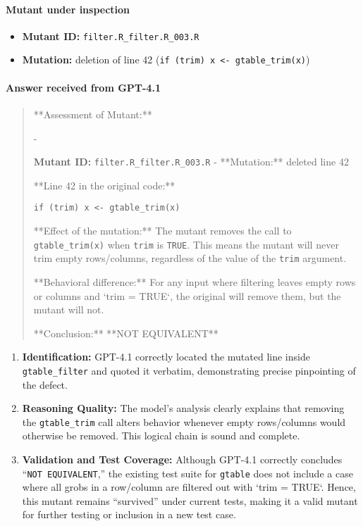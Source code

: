 \paragraph{Mutant under inspection}
\begin{itemize}
  \item \textbf{Mutant ID:} \texttt{filter.R\_filter.R\_003.R}
  \item \textbf{Mutation:} deletion of line 42 (\texttt{if (trim) x <- gtable\_trim(x)})
\end{itemize}

\paragraph{Answer received from GPT-4.1}
\begin{quote}
**Assessment of Mutant:**

-   \item \textbf{Mutant ID:} \texttt{filter.R\_filter.R\_003.R}  
- **Mutation:** deleted line 42

**Line 42 in the original code:**
\begin{verbatim}
if (trim) x <- gtable_trim(x)
\end{verbatim}

**Effect of the mutation:**  
The mutant removes the call to \texttt{gtable\_trim(x)} when \texttt{trim} is \texttt{TRUE}. This means the mutant will never trim empty rows/columns, regardless of the value of the \texttt{trim} argument.

**Behavioral difference:**  
For any input where filtering leaves empty rows or columns and `trim = TRUE`, the original will remove them, but the mutant will not.

**Conclusion:**  
**NOT EQUIVALENT**
\end{quote}

\begin{enumerate}
  \item \textbf{Identification:}  
    GPT-4.1 correctly located the mutated line inside \texttt{gtable\_filter} and quoted it verbatim, demonstrating precise pinpointing of the defect.
  
     \item \textbf{Reasoning Quality:}  
    The model’s analysis clearly explains that removing the \texttt{gtable\_trim} call alters behavior whenever empty rows/columns would otherwise be removed. This logical chain is sound and complete.


  \item \textbf{Validation and Test Coverage:}  
    Although GPT-4.1 correctly concludes “\texttt{NOT EQUIVALENT},” the existing test suite for \texttt{gtable} does not include a case where all grobs in a row/column are filtered out with `trim = TRUE`.  Hence, this mutant remains “survived” under current tests, making it a valid mutant for further testing or inclusion in a new test case.
\end{enumerate}

